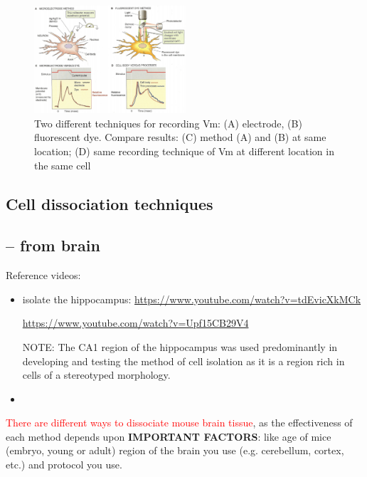 \begin{figure}[hbt]
  \centerline{\includegraphics[height=4cm,
    angle=0]{./images/recording-Vm.eps}}
\caption{Two different techniques for recording Vm: (A) electrode, (B)
fluorescent dye. Compare results: (C) method (A)  and (B) at same location; (D)
same recording technique of Vm at different location in the same cell}
\label{fig:recording-Vm}
\end{figure}

\subsection{Cell dissociation techniques}
\label{sec:technique-cell-dissociation}

\subsection{-- from brain}

Reference videos:
\begin{itemize}
  \item isolate the hippocampus:
  \url{https://www.youtube.com/watch?v=tdEvicXkMCk}

  \url{https://www.youtube.com/watch?v=Upf15CB29V4}

NOTE: The CA1 region of the hippocampus was used predominantly in developing and
testing the method of cell isolation as it is a region rich in cells of a
stereotyped morphology.

  \item
\end{itemize}

\textcolor{red}{There are different ways to dissociate mouse brain tissue}, as
the effectiveness of each method depends upon {\bf IMPORTANT FACTORS}:
like age of mice (embryo, young or adult) region of the brain you use (e.g.
cerebellum, cortex, etc.) and protocol you use.


